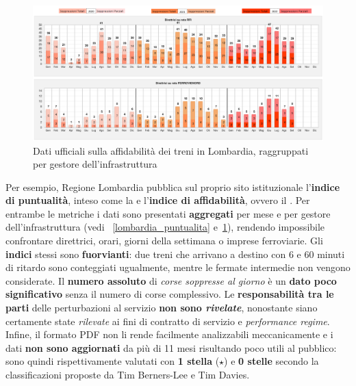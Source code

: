 \documentclass[12pt,a4paper,italian]{report}
\begin{document}
\begin{figure}[h] \centering
    \includegraphics[width=\linewidth]{images/lombardia_affidabilita.png}
    \caption{Dati ufficiali sulla affidabilità dei treni in Lombardia,
        raggruppati per gestore dell'infrastruttura
        \cite{LombardiaDati}}
    \label{lombardia_affidabilita}
\end{figure}

Per esempio, Regione Lombardia pubblica sul proprio sito istituzionale
\cite{LombardiaDati} l'\textbf{indice di puntualità}, inteso come la
 e
l'\textbf{indice di affidabilità}, ovvero il .  Per entrambe le metriche i
dati sono presentati \textbf{aggregati} per mese e per gestore
dell'infrastruttura (vedi \figurename~\ref{lombardia_puntualita}
e~\ref{lombardia_affidabilita}), rendendo impossibile confrontare
direttrici, orari, giorni della settimana o imprese ferroviarie.  Gli
\textbf{indici} stessi sono \textbf{fuorvianti}: due treni che
arrivano a destino con 6 e 60 minuti di ritardo sono conteggiati
ugualmente, mentre le fermate intermedie non vengono considerate.  Il
\textbf{numero assoluto} di \textit{corse soppresse al giorno} è un
\textbf{dato poco significativo} senza il numero di corse complessivo.
Le \textbf{responsabilità tra le parti} delle perturbazioni al
servizio \textbf{non sono \textit{rivelate}}, nonostante siano
certamente state \textit{rilevate} ai fini di contratto di servizio e
\textit{performance regime}.  Infine, il formato PDF non li rende
facilmente analizzabili meccanicamente e i dati \textbf{non sono
    aggiornati} da più di 11 mesi risultando poco utili al pubblico:
sono quindi rispettivamente valutati con \textbf{1 stella} ($\star$) e
\textbf{0 stelle} secondo la classificazioni proposte da Tim
Berners-Lee e Tim Davies.
\end{document}
